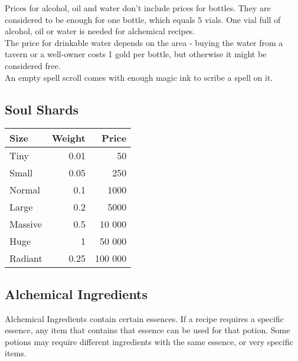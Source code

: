 Prices for alcohol, oil and water don't include prices for bottles. They are considered to be enough for one bottle, which equals 5 vials. One vial full of alcohol, oil or water is needed for alchemical recipes. \\

The price for drinkable water depends on the area - buying the water from a tavern or a well-owner costs 1 gold per bottle, but otherwise it might be considered free.\\

An empty spell scroll comes with enough magic ink to scribe a spell on it.\\


\subsection{Soul Shards}
\begin{longtable}{l | r | r}
	Size & Weight & Price\\ \hline
	Tiny & 0.01 & 50\\
	Small & 0.05 & 250\\
	Normal & 0.1 & 1000\\
	Large & 0.2 & 5000\\
	Massive & 0.5 & 10 000\\
	Huge & 1 & 50 000\\
	Radiant & 0.25 & 100 000\\
\end{longtable}


\subsection{Alchemical Ingredients}
Alchemical Ingredients contain certain essences. If a recipe requires a specific essence, any item that contains that essence can be used for that potion. Some potions may require different ingredients with the same essence, or very specific items. \\


